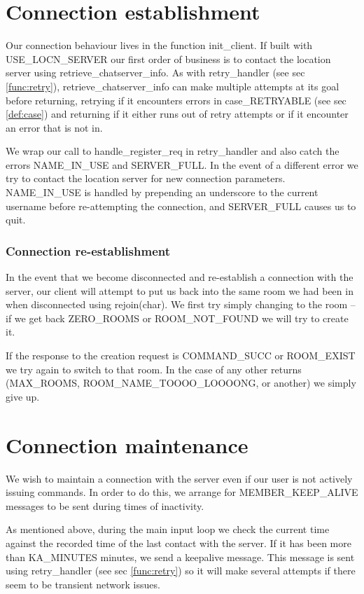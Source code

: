 \documentclass{article}
\begin{document}
\section{Connection establishment}
Our connection behaviour lives in the function init\_client.
If built with USE\_LOCN\_SERVER our first order of business is to contact
the location server using retrieve\_chatserver\_info. As with 
retry\_handler (see sec \ref{func:retry}), retrieve\_chatserver\_info can
make multiple attempts
at its goal before returning, retrying if it encounters errors in
case\_RETRYABLE (see sec \ref{def:case}) and returning if it either runs
out of retry attempts or if it encounter an error that is not in.

We wrap our call to handle\_register\_req in retry\_handler and also
catch the errors NAME\_IN\_USE and SERVER\_FULL. In the event of a different
error we try to contact the location server for new connection parameters.
NAME\_IN\_USE is handled by prepending an underscore to the current username
before re-attempting the connection, and SERVER\_FULL causes us to quit.

\subsubsection{Connection re-establishment}
In the event that we become disconnected and re-establish a connection with
the server, our client will attempt to put us back into the same room we had
been in when disconnected using rejoin(char). We first try simply changing to
the room -- if we get back ZERO\_ROOMS or ROOM\_NOT\_FOUND we will try to
create it.

If the response to the creation request is COMMAND\_SUCC or ROOM\_EXIST we
try again to switch to that room. In the case of any other returns
(MAX\_ROOMS, ROOM\_NAME\_TOOOO\_LOOOONG, or another) we simply give up.

\section{Connection maintenance}
We wish to maintain a connection with the server even if our user is not
actively issuing commands. In order to do this, we arrange for 
MEMBER\_KEEP\_ALIVE messages to be sent during times of inactivity.

As mentioned above, during the main input loop we check the current time
against the recorded time of the last contact with the server. If it has
been more than KA\_MINUTES minutes, we send a keepalive message. This message
is sent using retry\_handler (see sec \ref{func:retry}) so it will make
several attempts if there seem to be transient network issues.
\end{document}
